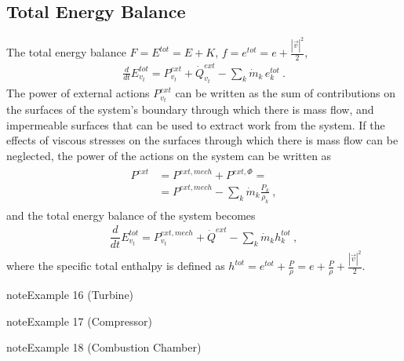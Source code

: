 \documentclass[letterpaper,10pt,english]{jupyterBook}
\begin{document}
\subsection{Total Energy Balance}
\label{\detokenize{ch/principles-open:total-energy-balance}}
\sphinxAtStartPar
The total energy balance \(F = E^{tot} = E + K\), \(f = e^{tot} = e + \frac{|\vec{v}|^2}{2}\),
\begin{equation*}
\begin{split}\frac{d}{dt} E^{tot}_{v_t} = P^{ext}_{v_t}  + \dot{Q}^{ext}_{v_t}  - \sum_k \dot{m}_k \, e^{tot}_k \ .\end{split}
\end{equation*}
\sphinxAtStartPar
The power of external actions \(P^{ext}_{v_t}\) can be written as the sum of contributions on the surfaces of the system’s boundary through which there is mass flow, and impermeable surfaces that can be used to extract work from the system. If the effects of viscous stresses on the surfaces through which there is mass flow can be neglected, the power of the actions on the system can be written as
\begin{equation*}
\begin{split}\begin{aligned}
  P^{ext} & = P^{ext,mech} + P^{ext,\Phi} = \\
          & = P^{ext,mech} - \sum_{k} \dot{m}_k \frac{P_k}{\rho_k} \ , 
\end{aligned}\end{split}
\end{equation*}
\sphinxAtStartPar
and the total energy balance of the system becomes
\begin{equation*}
\begin{split}\dfrac{d}{dt} E^{tot}_{v_t} = P^{ext,mech}_{v_t} + \dot{Q}^{ext} - \sum_k \dot{m}_k h^{tot}_k \ ,\end{split}
\end{equation*}
\sphinxAtStartPar
where the specific total enthalpy is defined as \(h^{tot} = e^{tot} + \frac{P}{\rho} = e + \frac{P}{\rho} + \frac{|\vec{v}|^2}{2}\).
\label{ch/principles-open:thermodynamics:principles:open:ex:turbine}
\begin{sphinxadmonition}{note}{Example 16 (Turbine)}


\end{sphinxadmonition}
\label{ch/principles-open:thermodynamics:principles:open:ex:compressor}
\begin{sphinxadmonition}{note}{Example 17 (Compressor)}


\end{sphinxadmonition}
\label{ch/principles-open:thermodynamics:principles:open:ex:comb-chamber}
\begin{sphinxadmonition}{note}{Example 18 (Combustion Chamber)}


\end{sphinxadmonition}
\end{document}

